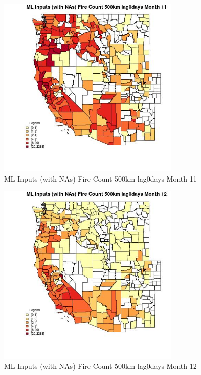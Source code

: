 \begin{figure} 
\centering  
\includegraphics[width=0.77\textwidth]{Code_Outputs/Report_ML_input_PM25_Step4_part_e_de_duplicated_aves_compiled_2019-05-20wNAs_CountyFire_Count_500km_lag0daysmedianMonth11.jpg} 
\caption{\label{fig:Report_ML_input_PM25_Step4_part_e_de_duplicated_aves_compiled_2019-05-20wNAsCountyFire_Count_500km_lag0daysmedianMonth11}ML Inputs (with NAs) Fire Count 500km lag0days Month 11} 
\end{figure} 
 

\begin{figure} 
\centering  
\includegraphics[width=0.77\textwidth]{Code_Outputs/Report_ML_input_PM25_Step4_part_e_de_duplicated_aves_compiled_2019-05-20wNAs_CountyFire_Count_500km_lag0daysmedianMonth12.jpg} 
\caption{\label{fig:Report_ML_input_PM25_Step4_part_e_de_duplicated_aves_compiled_2019-05-20wNAsCountyFire_Count_500km_lag0daysmedianMonth12}ML Inputs (with NAs) Fire Count 500km lag0days Month 12} 
\end{figure} 
 

